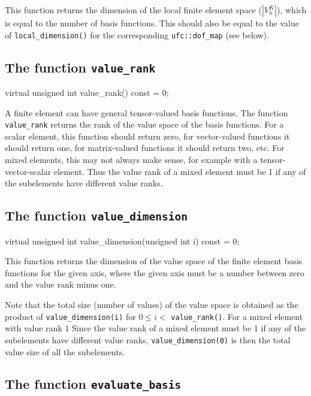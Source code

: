 This function returns the dimension of the local finite element space
($|V_h^K|$), which is equal to the number of basis functions. This
should also be equal to the value of \texttt{local\_dimension()} for
the corresponding \texttt{ufc::dof\_map} (see below).

\subsection{The function \texttt{value\_rank}}

\begin{code}
virtual unsigned int value_rank() const = 0;
\end{code}

A finite element can have general tensor-valued basis functions.  The
function \texttt{value\_rank} returns the rank of the value space of
the basis functions. For a scalar element, this function should return
zero, for vector-valued functions it should return one, for
matrix-valued functions it should return two, etc. For mixed elements, this
may not always make sense, for example with a tensor-vector-scalar element.
Thus the value rank of a mixed element must be 1 if any of the subelements have
different value ranks.

\subsection{The function \texttt{value\_dimension}}

\begin{code}
virtual unsigned int
value_dimension(unsigned int i) const = 0;
\end{code}

This function returns the dimension of the value space of the finite
element basis functions for the given axis, where the given axis must
be a number between zero and the value rank minus one.

Note that the total size (number of values) of the value space is
obtained as the product of \texttt{value\_dimension(i)} for $0 \le i <$
\texttt{value\_rank()}. For a mixed element with value rank 1 
Since the value rank of a mixed element must be 1 if any of the subelements
have different value ranks, \texttt{value\_dimension(0)} is then the total value
size of all the subelements.

\subsection{The function \texttt{evaluate\_basis}}

